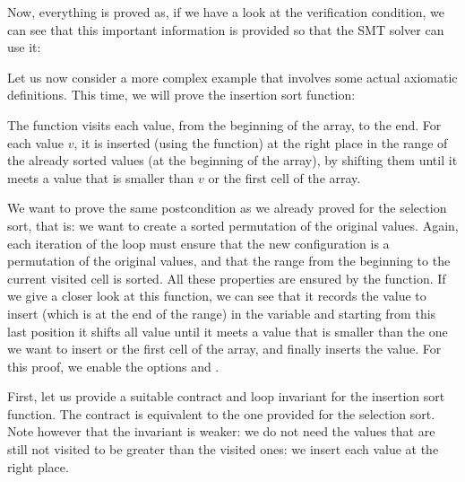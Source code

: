 


Now, everything is proved as, if we have a look at the verification condition,
we can see that this important information is provided so that the SMT solver
can use it:








Let us now consider a more complex example that involves some actual axiomatic
definitions. This time, we will prove the insertion sort function:





The  function visits each value, from the beginning
of the array, to the end. For each value $v$, it is inserted (using the
 function) at the right place in the range of the already
sorted values (at the beginning of the array), by shifting them until it meets
a value that is smaller than $v$ or the first cell of the array.




We want to prove the same postcondition as we already proved for the selection
sort, that is: we want to create a sorted permutation of the original values.
Again, each iteration of the loop must ensure that the new configuration is a
permutation of the original values, and that the range from the beginning to
the current visited cell is sorted. All these properties are ensured by the
 function. If we give a closer look at this function, we can
see that it records the value to insert (which is at the end of the range) in
the variable  and starting from this last position it shifts
all value until it meets a value that is smaller than the one we want to insert
or the first cell of the array, and finally inserts the value. For this proof,
we enable the options  and
.




First, let us provide a suitable contract and loop invariant for the insertion
sort function. The contract is equivalent to the one provided for the selection
sort. Note however that the invariant is weaker: we do not need the values that
are still not visited to be greater than the visited ones: we insert each value
at the right place.



